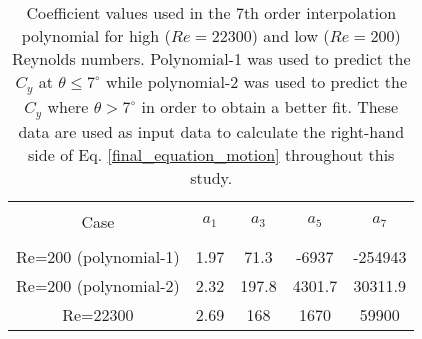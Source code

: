 \begin{table}[ht]

\begin{center}
\setlength{\unitlength}{\textwidth}

\begin{tabular}{c c c c c} %
\hline\hline %
\\[0.2ex]
Case & $a_1$ & $a_3$ & $a_5$ & $a_7$ \\ [0.8ex] %
\hline 
\\[0.8ex]%
Re=200 (polynomial-1) & 1.97 & 71.3  &-6937 &-254943  \\[0.8ex]
Re=200 (polynomial-2)& 2.32 & 197.8 & 4301.7 & 30311.9 \\[0.8ex]%
Re=22300 & 2.69 & 168 & 1670 & 59900 \\ [1ex] %
\hline %
\end{tabular}

\caption{Coefficient values used in the 7th order interpolation polynomial for high ($Re=22300$) and low ($Re=200$) Reynolds numbers. Polynomial-1 was used to predict the $C_y$ at $\theta \leq 7^{\circ}$ while polynomial-2 was used to predict the $C_y$ where $\theta>7^{\circ}$ in order to obtain a better fit. These data are used as input data to calculate the right-hand side of Eq. \ref{final_equation_motion} throughout this study.}
 
\label{table:cy-coefficients} %
\end{center}
\end{table}

